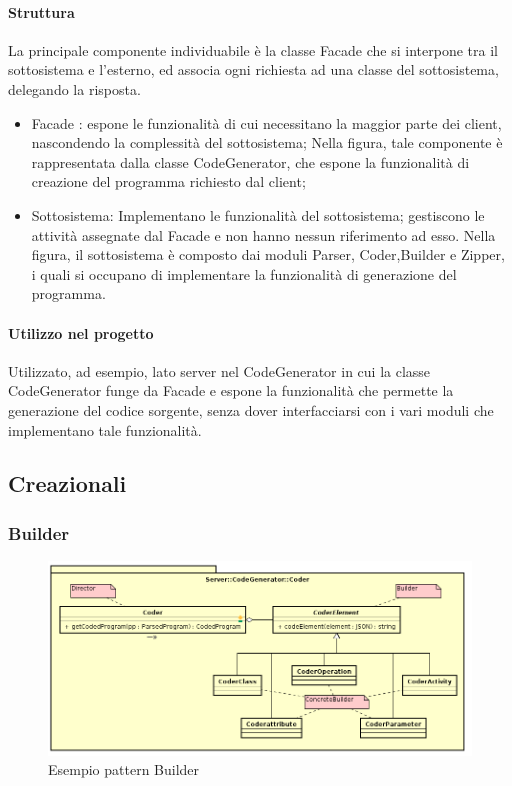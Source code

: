\documentclass[../PianoDiQualifica.tex]{subfiles}
\begin{document}
				\paragraph{Struttura\\}
					La principale componente individuabile è la classe Facade che si interpone tra il
					sottosistema e l'esterno, ed associa ogni richiesta ad una classe del sottosistema,
					delegando la risposta.
					\begin{itemize}
						\item Facade : espone le funzionalità di cui necessitano la maggior parte dei client, nascondendo la complessità del sottosistema; Nella figura, tale componente è rappresentata dalla classe CodeGenerator, che espone la funzionalità di creazione del programma richiesto dal client;
						\item Sottosistema: Implementano le funzionalità del sottosistema; gestiscono le attività assegnate dal Facade e non hanno nessun riferimento ad esso. Nella figura, il sottosistema è composto dai moduli Parser, Coder,Builder e Zipper, i quali si occupano di implementare la funzionalità di generazione del programma.
					\end{itemize}
					
				\paragraph{Utilizzo nel progetto\\}
					Utilizzato, ad esempio, lato server nel CodeGenerator in cui la classe CodeGenerator funge da Facade e espone la funzionalità che permette la generazione del codice sorgente, senza dover interfacciarsi con i vari moduli che implementano tale funzionalità.
		\subsection{Creazionali}
			\subsubsection{Builder}
				\begin{figure}[H] \label{fig:Builder}
					\centering
					\includegraphics[scale=0.5]{Immagini/Builder.png}
					\caption{Esempio pattern Builder}
				\end{figure}
\end{document}
